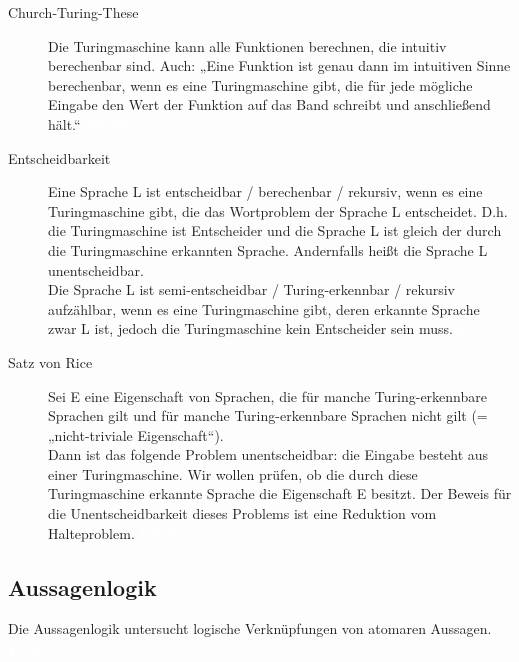 \documentclass[a4paper,10pt]{article}
\newcommand{\vl}[1]{\colorbox{vl}{\textcolor{white}{\small\textbf{#1}}}}
\begin{document}
\begin{description}
        \item[Church-Turing-These]
            Die Turingmaschine kann alle Funktionen berechnen, die intuitiv berechenbar sind. Auch: „Eine Funktion ist genau dann
            im intuitiven Sinne berechenbar, wenn es eine Turingmaschine gibt, die für jede mögliche Eingabe den Wert der Funktion auf
            das Band schreibt und anschließend hält.“ \vl{FS 18}

        \item[Entscheidbarkeit]
            Eine Sprache L ist entscheidbar / berechenbar / rekursiv, wenn es eine Turingmaschine gibt, die das Wortproblem der Sprache L entscheidet.
            D.h. die Turingmaschine ist Entscheider und die Sprache L ist gleich der durch die Turingmaschine erkannten Sprache.
            Andernfalls heißt die Sprache L unentscheidbar. \\
            Die Sprache L ist semi-entscheidbar / Turing-erkennbar / rekursiv aufzählbar, wenn es eine Turingmaschine gibt, deren erkannte Sprache zwar L ist, jedoch die Turingmaschine kein Entscheider sein muss. \vl{FS 19}

        \item[Satz von Rice]
            Sei E eine Eigenschaft von Sprachen, die für manche Turing-erkennbare Sprachen gilt und für manche Turing-erkennbare Sprachen nicht gilt (= „nicht-triviale Eigenschaft“). \\ Dann ist das folgende Problem unentscheidbar: die Eingabe besteht aus einer Turingmaschine. Wir wollen prüfen, ob die durch diese Turingmaschine erkannte Sprache die Eigenschaft E besitzt. Der Beweis für die Unentscheidbarkeit dieses Problems ist eine Reduktion vom Halteproblem. \vl{FS 20}

    \end{description}

    \newpage
    \subsection{Aussagenlogik}
        Die Aussagenlogik untersucht logische Verknüpfungen von atomaren Aussagen. \vl{FS 21}
\end{document}
